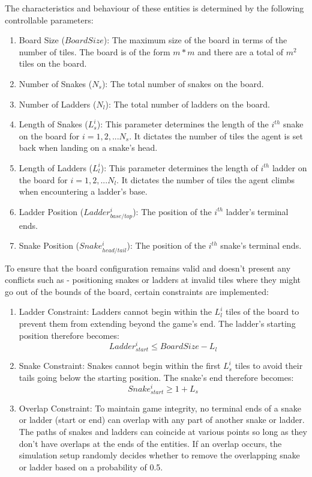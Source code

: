 \documentclass[12pt]{report}
\begin{document}
	The characteristics and  behaviour of these entities is determined by the following controllable parameters:
	\begin{enumerate}
		\item Board Size ($BoardSize$): The maximum size of the board in terms of the number of tiles. The board is of the form $m * m$ and there are a total of $m^2$ tiles on the board.
		\item Number of Snakes ($N_{s}$): The total number of snakes on the board.
		\item Number of Ladders ($N_{l}$): The total number of ladders on the board.
		\item Length of Snakes ($L^{i}_{s}$): This parameter determines the length of the $i^{th}$ snake on the board for $i=1,2,... N_{s}$. It dictates the number of tiles the agent is set back when landing on a snake's head.
		\item Length of Ladders ($L^{i}_{l}$): This parameter determines the length of $i^{th}$ ladder on the board for $i=1,2,... N_{l}$. It dictates the number of tiles the agent climbs when encountering a ladder's base.
		\item Ladder Position ($Ladder^{i}_{base/top}$): The position of the $i^{th}$ ladder's terminal ends.
		\item Snake Position ($Snake^{i}_{head/tail}$): The position of the $i^{th}$ snake's terminal ends.
	\end{enumerate}
	
	To ensure that the board configuration remains valid and doesn't present any conflicts such as - positioning snakes or ladders at invalid tiles where they might go out of the bounds of the board, certain constraints are implemented:
	
	\begin{enumerate}
		\item Ladder Constraint: Ladders cannot begin within the $L^{i}_{l}$ tiles of the board to prevent them from extending beyond the game's end. The ladder's starting position therefore becomes:  $$Ladder^{i}_{start} \leq BoardSize - L_{l}$$
		\item Snake Constraint: Snakes cannot begin within the first $L^{i}_{s}$ tiles to avoid their tails going below the starting position. The snake's end therefore becomes: $$Snake^{i}_{start}\geq 1 + L_{s}$$
		\item Overlap Constraint: To maintain game integrity, no terminal ends of a snake or ladder (start or end) can overlap with any part of another snake or ladder. The paths of snakes and ladders can coincide at various points so long as they don't have overlaps at the ends of the entities. If an overlap occurs, the simulation setup randomly decides whether to remove the overlapping snake or ladder based on a probability of 0.5.
	\end{enumerate}
	
\end{document}
